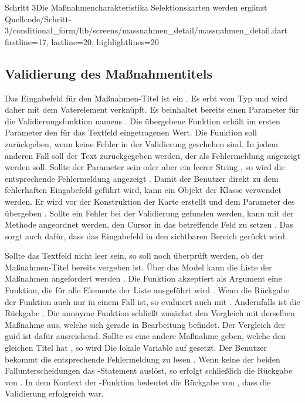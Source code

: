 \begin{alexlisting}{Schritt 3}{Die Maßnahmencharakteristika Selektionskarten werden ergänzt}
    {Quellcode/Schritt-3/conditional_form/lib/screens/massnahmen_detail/massnahmen_detail.dart}
    {firstline=17, lastline=20, highlightlines={20}}
    \label{lst:Schritt3FormState}
\end{alexlisting}

\subsection{Validierung des Maßnahmentitels}

Das Eingabefeld für den Maßnahmen-Titel ist ein  .
Es erbt vom Typ  und wird daher mit dem Vaterelement  verknüpft. 
Es beinhaltet bereits einen Parameter für die Validierungsfunktion namens  .
Die übergebene Funktion erhält im ersten Parameter den für das Textfeld eingetragenen Wert. 
Die Funktion soll  zurückgeben, wenn keine Fehler in der Validierung geschehen sind. 
In jedem anderen Fall soll der Text zurückgegeben werden, der als Fehlermeldung angezeigt werden soll. 
Sollte der Parameter  sein oder aber ein leerer String , so wird die entsprechende Fehlermeldung  angezeigt .
Damit der Benutzer direkt zu dem fehlerhaften Eingabefeld geführt wird, kann ein Objekt der Klasse  verwendet werden. 
Er wird vor der Konstruktion der Karte erstellt  und dem Parameter  des  übergeben .
Sollte ein Fehler bei der Validierung gefunden werden, kann mit der Methode  angeordnet werden, den Cursor in das betreffende Feld zu setzen . 
Das sorgt auch dafür, dass das Eingabefeld in den sichtbaren Bereich gerückt wird.

Sollte das Textfeld nicht leer sein, so soll noch überprüft werden, ob der Maßnahmen-Titel bereits vergeben ist. Über das Model kann die Liste der Maßnahmen angefordert werden .
Die Funktion  akzeptiert als Argument eine Funktion, die für alle Elemente der Liste ausgeführt wird . 
Wenn die Rückgabe der Funktion auch nur in einem Fall  ist, so evaluiert auch  mit .
Andernfalls ist die Rückgabe . 
Die anonyme Funktion schließt zunächst den Vergleich mit derselben Maßnahme aus, welche sich gerade in Bearbeitung befindet.
Der Vergleich der guid ist dafür ausreichend.
Sollte es eine andere Maßnahme geben, welche den gleichen Titel hat , so wird Die lokale Variable  auf  gesetzt.
Der Benutzer bekommt die entsprechende Fehlermeldung  zu lesen . 
Wenn keine der beiden Fallunterscheidungen das -Statement  auslöst, so erfolgt schließlich die Rückgabe von .
In dem Kontext der -Funktion bedeutet die Rückgabe von , dass die Validierung erfolgreich war.
 
